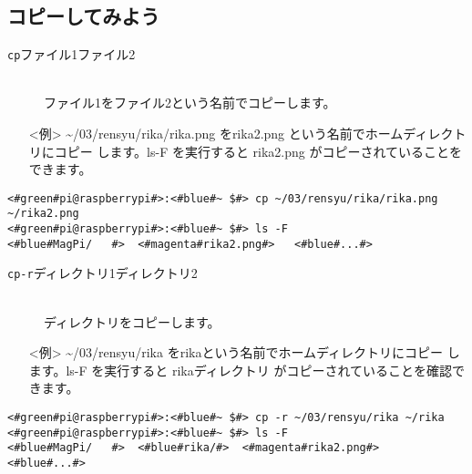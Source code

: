 \subsection{コピーしてみよう}
\begin{description}
\item[\texttt{cp}\textvisiblespace ファイル1\textvisiblespace ファイル2]\mbox{}\\
ファイル1をファイル2という名前でコピーします。
\end{description}
\begin{itemize}
\item[<例>]\textasciitilde /03/rensyu/rika/rika.png をrika2.png という名前でホームディレクトリにコピー
します。ls\textvisiblespace -F を実行すると rika2.png がコピーされていることをできます。
\end{itemize}
\begin{lstlisting}[caption=cpの例, label=cp]
<#green#pi@raspberrypi#>:<#blue#~ $#> cp ~/03/rensyu/rika/rika.png ~/rika2.png
<#green#pi@raspberrypi#>:<#blue#~ $#> ls -F
<#blue#MagPi/	#>	<#magenta#rika2.png#>	<#blue#...#>
\end{lstlisting}
\begin{description}
\item[\texttt{cp}\textvisiblespace \texttt{-r}\textvisiblespace ディレクトリ1\textvisiblespace ディレクトリ2]\mbox{}\\
ディレクトリをコピーします。
\end{description}
\begin{itemize}
\item[<例>]\textasciitilde /03/rensyu/rika をrikaという名前でホームディレクトリにコピー
します。ls\textvisiblespace -F を実行すると rikaディレクトリ がコピーされていることを確認できます。
\end{itemize}
\begin{lstlisting}[caption=cp -rの例, label=cp-R]
<#green#pi@raspberrypi#>:<#blue#~ $#> cp -r ~/03/rensyu/rika ~/rika
<#green#pi@raspberrypi#>:<#blue#~ $#> ls -F
<#blue#MagPi/	#>	<#blue#rika/#>	<#magenta#rika2.png#>	<#blue#...#>
\end{lstlisting}



